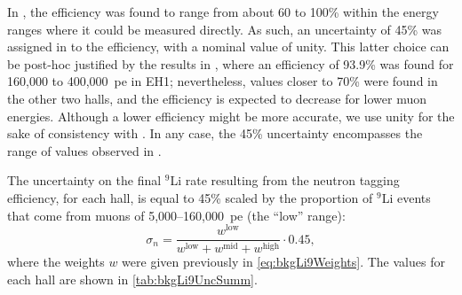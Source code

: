 \documentclass[../thesis.tex]{subfiles}
\begin{document}
In \cite{WeiLi9}, the efficiency was found to range from about 60 to 100\% within the energy ranges where it could be measured directly. As such, an uncertainty of 45\% was assigned in \cite{ChrisLi9} to the efficiency, with a nominal value of unity. This latter choice can be post-hoc justified by the results in \cite{MaWuLi9}, where an efficiency of 93.9\% was found for 160,000 to 400,000~pe in EH1; nevertheless, values closer to 70\% were found in the other two halls, and the efficiency is expected to decrease for lower muon energies. %
Although a lower efficiency might be more accurate, we use unity for the sake of consistency with \cite{ChrisLi9}. In any case,
the 45\% uncertainty encompasses the range of values observed in \cite{MaWuLi9}.


The uncertainty on the final $^9$Li rate resulting from the neutron tagging efficiency, for each hall, is equal to 45\% scaled by the proportion of $^9$Li events that come from muons of 5,000--160,000~pe (the ``low'' range):
\begin{equation}
  \sigma_n = \frac{w^{\mathrm{low}}}{w^{\mathrm{low}} + w^{\mathrm{mid}} + w^{\mathrm{high}}} \cdot 0.45,
\end{equation}
where the weights $w$ were given previously in \autoref{eq:bkgLi9Weights}. The values for each hall are shown in \autoref{tab:bkgLi9UncSumm}.
\end{document}
